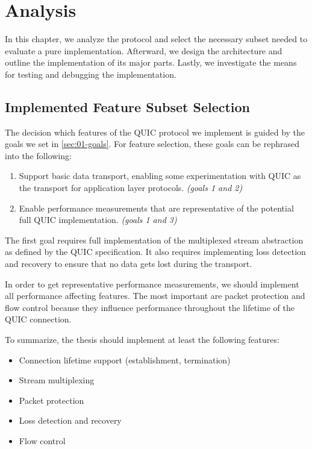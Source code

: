 \chapter{Analysis}\label{chap:03-analysis}

In this chapter, we analyze the protocol and select the necessary subset needed to evaluate a pure
\dotnet{} implementation. Afterward, we design the architecture and outline the implementation of
its major parts. Lastly, we investigate the means for testing and debugging the implementation.

\section{Implemented Feature Subset Selection}\label{sec:03-feature-selection}

The decision which features of the QUIC protocol we implement is guided by the goals we set in
\autoref{sec:01-goals}. For feature selection, these goals can be rephrased into the following:

\begin{enumerate}

  \item Support basic data transport, enabling some experimentation with QUIC as the transport for
application layer protocols. \textit{(goals 1 and 2)}

  \item Enable performance measurements that are representative of the potential full QUIC
implementation. \textit{(goals 1 and 3)}

\end{enumerate}

The first goal requires full implementation of the multiplexed stream abstraction as defined by the
QUIC specification. It also requires implementing loss detection and recovery to ensure that no data
gets lost during the transport.

In order to get representative performance measurements, we should implement all performance
affecting features. The most important are packet protection and flow control because they influence
performance throughout the lifetime of the QUIC connection.

To summarize, the thesis should implement at least the following features:

\begin{itemize}

    \item Connection lifetime support (establishment, termination)

    \item Stream multiplexing

    \item Packet protection

    \item Loss detection and recovery

    \item Flow control

\end{itemize}


